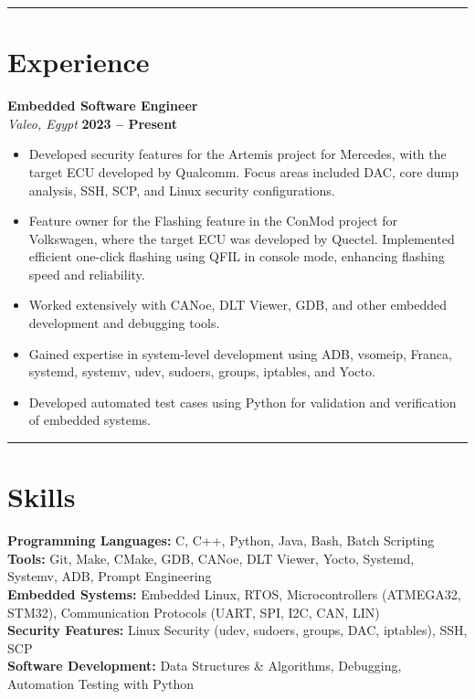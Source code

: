 \documentclass[a4paper,10pt]{article}
\begin{document}
\noindent\rule{\linewidth}{0.3mm} %

\section*{Experience}
\noindent
\textbf{Embedded Software Engineer} \\
\textit{Valeo, Egypt} \hfill \textbf{2023 – Present} \\
\begin{itemize}[leftmargin=*]
    \item Developed security features for the Artemis project for Mercedes, with the target ECU developed by Qualcomm. Focus areas included DAC, core dump analysis, SSH, SCP, and Linux security configurations.
    \item Feature owner for the Flashing feature in the ConMod project for Volkswagen, where the target ECU was developed by Quectel. Implemented efficient one-click flashing using QFIL in console mode, enhancing flashing speed and reliability.
    \item Worked extensively with CANoe, DLT Viewer, GDB, and other embedded development and debugging tools.
    \item Gained expertise in system-level development using ADB, vsomeip, Franca, systemd, systemv, udev, sudoers, groups, iptables, and Yocto.
    \item Developed automated test cases using Python for validation and verification of embedded systems.
\end{itemize}

\noindent\rule{\linewidth}{0.3mm} %

\section*{Skills}
\noindent
\textbf{Programming Languages:} C, C++, Python, Java, Bash, Batch Scripting \\
\textbf{Tools:} Git, Make, CMake, GDB, CANoe, DLT Viewer, Yocto, Systemd, Systemv, ADB, Prompt Engineering \\
\textbf{Embedded Systems:} Embedded Linux, RTOS, Microcontrollers (ATMEGA32, STM32), Communication Protocols (UART, SPI, I2C, CAN, LIN) \\
\textbf{Security Features:} Linux Security (udev, sudoers, groups, DAC, iptables), SSH, SCP \\
\textbf{Software Development:} Data Structures \& Algorithms, Debugging, Automation Testing with Python
\end{document}
